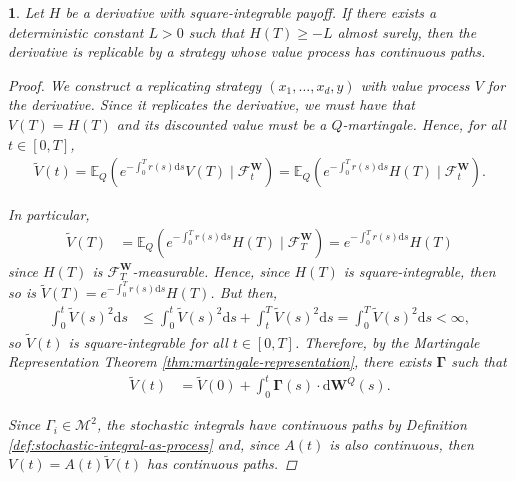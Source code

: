 \documentclass[english]{article}
\numberwithin{equation}{section}
\numberwithin{figure}{section}
\theoremstyle{bolddescit}
\newtheorem{theorem}{\protect\theoremname}[section]
\theoremstyle{definition}
\theoremstyle{definition}
\theoremstyle{plain}
\theoremstyle{plain}
\theoremstyle{bolddesc}
\theoremstyle{plain}
\theoremstyle{remark}
\providecommand{\theoremname}{Theorem}
\begin{document}
\begin{theorem}\label{thm:bs-replicability}
  Let $H$ be a derivative with square-integrable payoff. If there exists a deterministic constant $L > 0$ such that $H(T) \ge -L$ almost surely, then the derivative is replicable by a strategy whose value process has continuous paths.

  \begin{proof}
    We construct a replicating strategy $(x_1,\ldots,x_d,y)$ with value process $V$ for the derivative. Since it replicates the derivative, we must have that $V(T) = H(T)$ and its discounted value must be a $Q$-martingale. Hence, for all $t \in [0,T]$,
    \begin{align*}
      \widetilde{V}(t)
      = \mathbb{E}_Q\left(e^{-\int_0^T r(s) \mathrm{d}s} V(T) \mid \mathcal{F}^\mathbf{W}_t\right)
      = \mathbb{E}_Q\left(e^{-\int_0^T r(s) \mathrm{d}s} H(T) \mid \mathcal{F}^\mathbf{W}_t\right).
    \end{align*}

    In particular,
    \begin{align*}
      \widetilde{V}(T)
      &= \mathbb{E}_Q\left(e^{-\int_0^T r(s)\mathrm{d}s} H(T) \mid \mathcal{F}^\mathbf{W}_T\right)
      = e^{-\int_0^T r(s)\mathrm{d}s} H(T)
    \end{align*}
    since $H(T)$ is $\mathcal{F}^\mathbf{W}_T$-measurable. Hence, since $H(T)$ is square-integrable, then so is $\widetilde{V}(T) = e^{-\int_0^T r(s)\mathrm{d}s} H(T)$. But then,
    \begin{align*}
      \int_0^t \widetilde{V}(s)^2 \mathrm{d}s
      &\le \int_0^t \widetilde{V}(s)^2 \mathrm{d}s + \int_t^T \widetilde{V}(s)^2 \mathrm{d}s
      = \int_0^T \widetilde{V}(s)^2 \mathrm{d}s < \infty,
    \end{align*}
    so $\widetilde{V}(t)$ is square-integrable for all $t \in [0,T]$. Therefore, by the Martingale Representation Theorem \ref{thm:martingale-representation}, there exists $\mathbf{\Gamma}$ such that
    \begin{align}\label{eq:bs-repl-deriv-gamma}
      \widetilde{V}(t)
      &= \widetilde{V}(0) + \int_0^t \mathbf{\Gamma}(s) \cdot \mathrm{d}\mathbf{W}^Q(s).
    \end{align}

    Since $\Gamma_i \in \mathcal{M}^2$, the stochastic integrals have continuous paths by Definition \ref{def:stochastic-integral-as-process} and, since $A(t)$ is also continuous, then $V(t) = A(t) \widetilde{V}(t)$ has continuous paths.


\end{proof}
\end{theorem}
\end{document}
